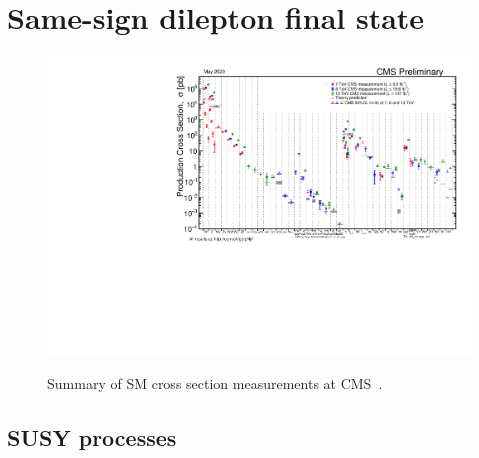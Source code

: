 \chapter{Same-sign dilepton final state}

\begin{figure}[!hbtp]
\centering
\includegraphics[width=.95\textwidth]{figs/misc/sm_xsecs.pdf} \\
\caption{Summary of SM cross section measurements at CMS~\cite{CMS:SMxsecs}.}
\label{fig:SMxsecs}
\end{figure}


\section{SUSY processes}

